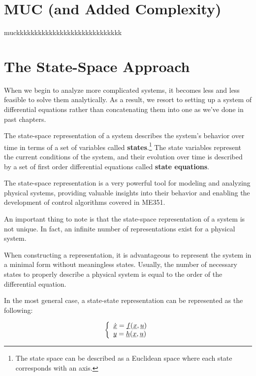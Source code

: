 \documentclass{report}
\begin{document}
\begin{onehalfspacing}
\begin{flushleft}
\section{MUC (and Added Complexity)}

muckkkkkkkkkkkkkkkkkkkkkkkkkkkkk

\section{The State-Space Approach}

When we begin to analyze more complicated systems, it becomes less and less feasible to solve them analytically. As a result, we resort to setting up a system of differential equations rather than concatenating them into one as we've done in past chapters.

\medskip

The state-space representation of a system describes the system's behavior over time in terms of a set of variables called \textbf{states}.\footnote{The state space can be described as a Euclidean space where each state corresponds with an axis.} The state variables represent the current conditions of the system, and their evolution over time is described by a set of first order differential equations called \textbf{state equations}.

\medskip

The state-space representation is a very powerful tool for modeling and analyzing physical systems, providing valuable insights into their behavior and enabling the development of control algorithms covered in ME351.

\medskip

An important thing to note is that the state-space representation of a system is not unique. In fact, an infinite number of representations exist for a physical system.

\medskip

When constructing a representation, it is advantageous to represent the system in a minimal form without meaningless states. Usually, the number of necessary states to properly describe a physical system is equal to the order of the differential equation.

\medskip

In the most general case, a state-state representation can be represented as the following:

\begin{equation*}
    \left\{ \begin{array}{ll}
        \underbar{\(\dot{x}\)} = \underbar{\(f\)}(\underbar{\(x\)}, \underbar{\(u\)}) \\
        \underbar{\(y\)} = \underbar{\(h\)}(\underbar{\(x\)}, \underbar{\(u\)})
    \end{array} \right.
\end{equation*}


\end{flushleft}
\end{onehalfspacing}
\end{document}
